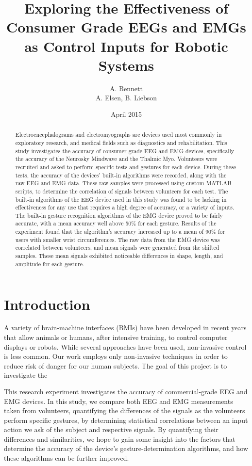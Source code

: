 \documentclass[journal]{IEEEtran}
\title{Exploring the Effectiveness of Consumer Grade EEGs and EMGs as Control Inputs for Robotic Systems}
\author{A. Bennett \\ A. Elsen, B. Liebson}
\date{April 2015}
\begin{document}
\maketitle

\begin{abstract}
Electroencephalograms and electromyographs are devices used most commonly in exploratory research, and medical fields such as diagnostics and rehabilitation. This study investigates the accuracy of consumer-grade EEG and EMG devices, specifically the accuracy of the Neurosky Mindwave and the Thalmic Myo. Volunteers were recruited and asked to perform specific tests and gestures for each device. During these tests, the accuracy of the devices' built-in algorithms were recorded, along with the raw EEG and EMG data. These raw samples were processed using custom MATLAB scripts, to determine the correlation of signals between volunteers for each test. The built-in algorithms of the EEG device used in this study was found to be lacking in effectiveness for any use that requires a high degree of accuracy, or a variety of inputs. The built-in gesture recognition algorithms of the EMG device proved to be fairly accurate, with a mean accuracy well above 50\% for each gesture. Results of the experiment found that the algorithm's accuracy increased up to a mean of 90\% for users with smaller wrist circumferences. The raw data from the EMG device was correlated between volunteers, and mean signals were generated from the shifted samples. These mean signals exhibited noticeable differences in shape, length, and amplitude for each gesture.
\end{abstract}

\raggedbottom
\section{Introduction}
A variety of brain-machine interfaces (BMIs) have been developed in recent years that allow animals or humans, after intensive training, to control computer displays or robots.  While several approaches have been used, non-invasive control is  less common. Our work employs only non-invasive techniques in order to reduce risk of danger for our human subjects.
The goal of this project is to investigate the

This research experiment investigates the accuracy of commercial-grade EEG and EMG devices. In this study, we compare both EEG and EMG measurements taken from volunteers, quantifying the differences of the signals as the volunteers perform specific gestures, by determining statistical correlations between an input action we ask of the subject and respective signals. By quantifying their differences and similarities, we hope to gain some insight into the factors that determine the accuracy of the device’s gesture-determination algorithms, and how these algorithms can be further improved. 
\end{document}
